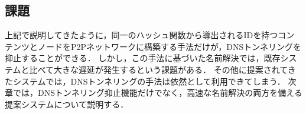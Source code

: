 \subsection{課題}
\label{sec:issue-past-works}
上記で説明してきたように，同一のハッシュ関数から導出されるIDを持つコンテンツとノードをP2Pネットワークに構築する手法だけが，DNSトンネリングを抑止することができる．
しかし，この手法に基づいた名前解決では，既存システムと比べて大きな遅延が発生するという課題がある．
その他に提案されてきたシステムでは，DNSトンネリングの手法は依然として利用できてしまう．
次章では，DNSトンネリング抑止機能だけでなく，高速な名前解決の両方を備える提案システムについて説明する．

